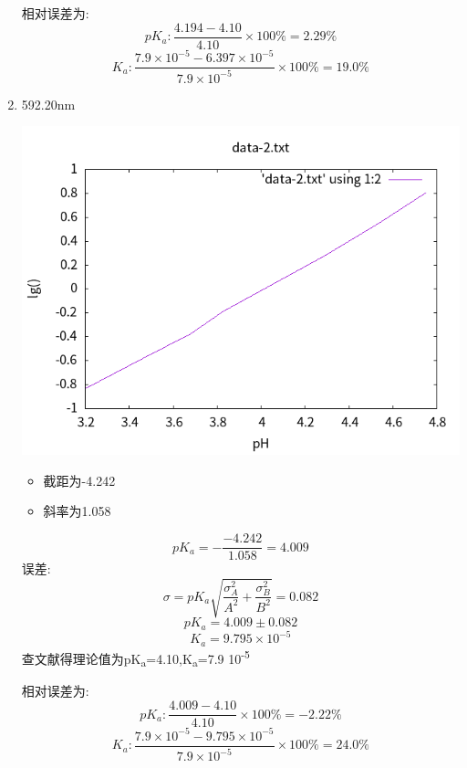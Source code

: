 \documentclass[11pt]{report}
\begin{document}
\begin{enumerate}
相对误差为:
\[
pK_{a}: \frac{4.194-4.10}{4.10}\times 100\% =2.29\%
\]
\[
K_{a}: \frac{7.9\times 10^{-5}-6.397\times 10^{-5}}{7.9\times 10^{-5}}\times 100\%=19.0\%
\]
\item 592.20nm
\label{sec:org33fe8ec}
\begin{center}
\includegraphics[width=.9\linewidth]{../img/data-2.txt.png}
\end{center}
\begin{itemize}
\item 截距为-4.242
\item 斜率为1.058
\end{itemize}
\[
pK_{a}=-\frac{-4.242}{1.058}=4.009
\]
误差:
\[
\sigma=pK_{a}\sqrt{\frac{\sigma_{A}^{2}}{A^{2}}+\frac{\sigma_{B}^{2}}{B^{2}}}=0.082
\]
\[
pK_{a}=4.009\pm 0.082
\]
\[
K_{a}=9.795\times 10^{-5}
\]
查文献得理论值为pK\textsubscript{a}=4.10,K\textsubscript{a}=7.9\texttimes{} 10\textsuperscript{-5}

相对误差为:
\[
pK_{a}: \frac{4.009-4.10}{4.10}\times 100\% =-2.22\%
\]
\[
K_{a}: \frac{7.9\times 10^{-5}-9.795\times 10^{-5}}{7.9\times 10^{-5}}\times 100\%=24.0\%
\]
\end{enumerate}
\end{document}
